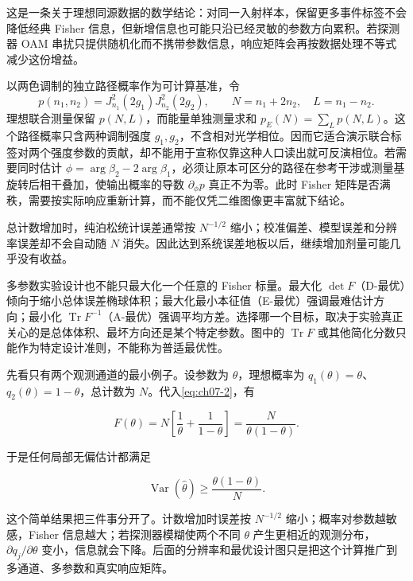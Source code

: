 这是一条关于理想同源数据的数学结论：对同一入射样本，保留更多事件标签不会降低经典 Fisher 信息，但新增信息也可能只沿已经灵敏的参数方向累积。若探测器 OAM 串扰只提供随机化而不携带参数信息，响应矩阵会再按数据处理不等式减少这份增益。

以两色调制的独立路径概率作为可计算基准，令
\begin{equation}
p(n_1,n_2)=J_{n_1}^2(2g_1)J_{n_2}^2(2g_2),\qquad
N=n_1+2n_2,\quad L=n_1-n_2.
\label{eq:oam-fisher-bessel-benchmark}
\end{equation}
理想联合测量保留 $p(N,L)$，而能量单独测量求和 $p_E(N)=\sum_Lp(N,L)$。这个路径概率只含两种调制强度 $g_1,g_2$，不含相对光学相位。因而它适合演示联合标签对两个强度参数的贡献，却不能用于宣称仅靠这种人口读出就可反演相位。若需要同时估计 $\phi=\arg\beta_2-2\arg\beta_1$，必须让原本可区分的路径在参考干涉或测量基旋转后相干叠加，使输出概率的导数 $\partial_\phi p$ 真正不为零。此时 Fisher 矩阵是否满秩，需要按实际响应重新计算，而不能仅凭二维图像更丰富就下结论。


总计数增加时，纯泊松统计误差通常按 $N^{-1/2}$ 缩小；校准偏差、模型误差和分辨率误差却不会自动随 $N$ 消失。因此达到系统误差地板以后，继续增加剂量可能几乎没有收益。

多参数实验设计也不能只最大化一个任意的 Fisher 标量。最大化 $\det F$（D-最优）倾向于缩小总体误差椭球体积；最大化最小本征值（E-最优）强调最难估计方向；最小化 $\operatorname{Tr}F^{-1}$（A-最优）强调平均方差。选择哪一个目标，取决于实验真正关心的是总体体积、最坏方向还是某个特定参数。图中的 $\operatorname{Tr}F$ 或其他简化分数只能作为特定设计准则，不能称为普适最优性。


先看只有两个观测通道的最小例子。设参数为 $\theta$，理想概率为 $q_1(\theta)=\theta$、$q_2(\theta)=1-\theta$，总计数为 $N$。代入\cref{eq:ch07-2}，有


\begin{equation*}
F(\theta)=N\left[\frac{1}{\theta}+\frac{1}{1-\theta}\right]=\frac{N}{\theta(1-\theta)}.
\end{equation*}


于是任何局部无偏估计都满足


\begin{equation*}
\operatorname{Var}(\hat\theta)\ge \frac{\theta(1-\theta)}{N}.
\end{equation*}


这个简单结果把三件事分开了。计数增加时误差按 $N^{-1/2}$ 缩小；概率对参数越敏感，Fisher 信息越大；若探测器模糊使两个不同 $\theta$ 产生更相近的观测分布，$\partial q_j/\partial\theta$ 变小，信息就会下降。后面的分辨率和最优设计图只是把这个计算推广到多通道、多参数和真实响应矩阵。

